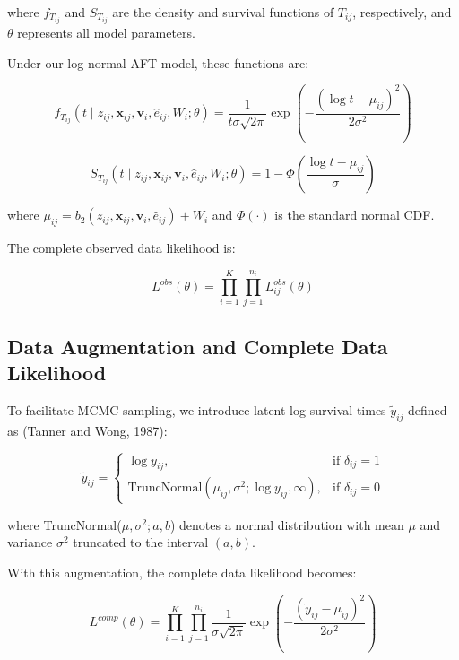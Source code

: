 \documentclass[useAMS,referee]{biom}
\begin{document}
where $f_{T_{ij}}$ and $S_{T_{ij}}$ are the density and survival functions of $T_{ij}$, respectively, and $\theta$ represents all model parameters.

Under our log-normal AFT model, these functions are:

\begin{equation}
f_{T_{ij}}(t \mid z_{ij}, \mathbf{x}_{ij}, \mathbf{v}_i, \hat{e}_{ij}, W_i; \theta) = \frac{1}{t\sigma\sqrt{2\pi}} \exp\left(-\frac{(\log t - \mu_{ij})^2}{2\sigma^2}\right)
\end{equation}

\begin{equation}
S_{T_{ij}}(t \mid z_{ij}, \mathbf{x}_{ij}, \mathbf{v}_i, \hat{e}_{ij}, W_i; \theta) = 1 - \Phi\left(\frac{\log t - \mu_{ij}}{\sigma}\right)
\end{equation}

where $\mu_{ij} = b_2(z_{ij}, \mathbf{x}_{ij}, \mathbf{v}_i, \hat{e}_{ij}) + W_i$ and $\Phi(\cdot)$ is the standard normal CDF.

The complete observed data likelihood is:

\begin{equation}
L^{obs}(\theta) = \prod_{i=1}^K \prod_{j=1}^{n_i} L_{ij}^{obs}(\theta)
\end{equation}

\subsection{Data Augmentation and Complete Data Likelihood}

To facilitate MCMC sampling, we introduce latent log survival times $\tilde{y}_{ij}$ defined as (Tanner and Wong, 1987):

\begin{equation}
\tilde{y}_{ij} = \begin{cases}
\log y_{ij}, & \text{if } \delta_{ij} = 1 \\
\text{TruncNormal}(\mu_{ij}, \sigma^2; \log y_{ij}, \infty), & \text{if } \delta_{ij} = 0
\end{cases}
\end{equation}

where TruncNormal($\mu, \sigma^2; a, b$) denotes a normal distribution with mean $\mu$ and variance $\sigma^2$ truncated to the interval $(a, b)$.

With this augmentation, the complete data likelihood becomes:

\begin{equation}
L^{comp}(\theta) = \prod_{i=1}^K \prod_{j=1}^{n_i} \frac{1}{\sigma\sqrt{2\pi}} \exp\left(-\frac{(\tilde{y}_{ij} - \mu_{ij})^2}{2\sigma^2}\right)
\end{equation}
\end{document}

